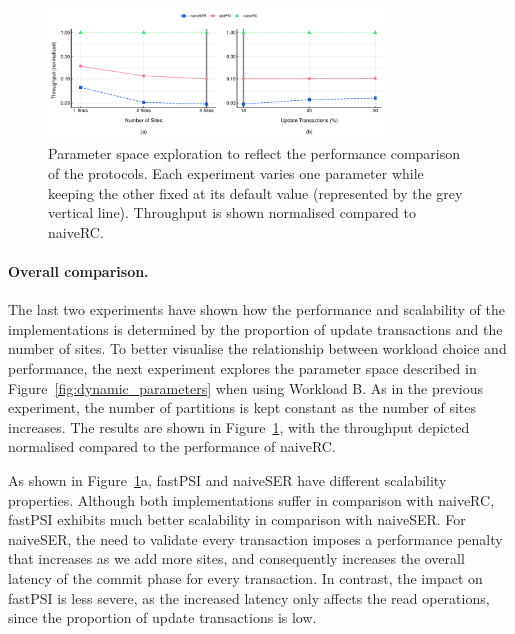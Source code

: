 \begin{figure}[t]
\begin{center}
\includegraphics[width=0.8\textwidth]{figures/dynamic_bench.pdf}
\vspace{-0.75cm}
\end{center}
\caption{Parameter space exploration to reflect the performance comparison of the protocols. Each experiment varies one parameter while keeping the other fixed at its default value (represented by the grey vertical line). Throughput is shown normalised compared to naiveRC.}
\label{fig:dynamic_bench}
\end{figure}

\paragraph{Overall comparison.} The last two experiments have shown how the performance and scalability of the implementations is determined by the proportion of update transactions and the number of sites. To better visualise the relationship between workload choice and performance, the next experiment explores the parameter space described in Figure~\ref{fig:dynamic_parameters} when using Workload B. As in the previous experiment, the number of partitions is kept constant as the number of sites increases. The results are shown in Figure~\ref{fig:dynamic_bench}, with the throughput depicted normalised compared to the performance of naiveRC.

As shown in Figure~\ref{fig:dynamic_bench}a, fastPSI and naiveSER have different scalability properties. Although both implementations suffer in comparison with naiveRC, fastPSI exhibits much better scalability in comparison with naiveSER. For naiveSER, the need to validate every transaction imposes a performance penalty that increases as we add more sites, and consequently increases the overall latency of the commit phase for every transaction. In contrast, the impact on fastPSI is less severe, as the increased latency only affects the read operations, since the proportion of update transactions is low.

